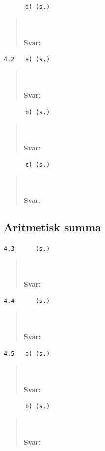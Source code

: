 \documentclass[a4paper]{article}
\newcommand{\tskcol}[1]{\textcolor{tskcol}{#1}}
\begin{document}
	\texttt{\tskcol{~~~~~~d) (s.)}}
	\begin{quotation}
		\noindent
		\\ \\
		\textbf{Svar:} 
	\end{quotation}
	
	\texttt{\tskcol{4.2~~~a) (s.)}}
	\begin{quotation}
		\noindent
		\\ \\
		\textbf{Svar:} 
	\end{quotation}
	
	\texttt{\tskcol{~~~~~~b) (s.)}}
	\begin{quotation}
		\noindent
		\\ \\
		\textbf{Svar:} 
	\end{quotation}
	
	\texttt{\tskcol{~~~~~~c) (s.)}}
	\begin{quotation}
		\noindent
		\\ \\
		\textbf{Svar:} 
	\end{quotation}
	
	\subsection*{Aritmetisk summa}
	
	\texttt{\tskcol{4.3~~~~~ (s.)}}
	\begin{quotation}
		\noindent
		\\ \\
		\textbf{Svar:} 
	\end{quotation}
	
	\texttt{\tskcol{4.4~~~~~ (s.)}}
	\begin{quotation}
		\noindent
		\\ \\
		\textbf{Svar:} 
	\end{quotation}
	
	\texttt{\tskcol{4.5~~~a) (s.)}}
	\begin{quotation}
		\noindent
		\\ \\
		\textbf{Svar:} 
	\end{quotation}
	
	\texttt{\tskcol{~~~~~~b) (s.)}}
	\begin{quotation}
		\noindent
		\\ \\
		\textbf{Svar:} 
	\end{quotation}
	
\end{document}
